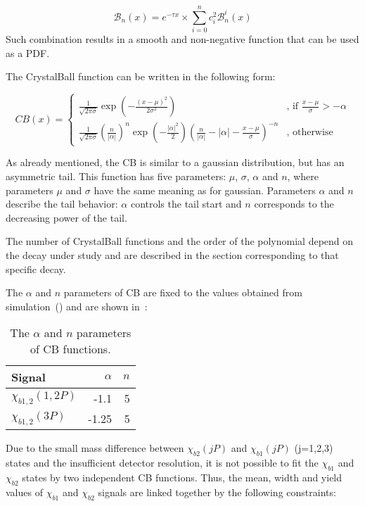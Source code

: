 \begin{equation}
\label{eq:bernstein}
{\mathscr B}_{n}(x) = e^{-\tau x} \times \sum_{i=0}^{n} c_{i}^2 {\mathscr B}_{n}^{i}(x)
\end{equation}
Such combination results in a smooth and non-negative function that can be used
as a PDF.

The CrystalBall function can be written in the following form:

\begin{equation}
CB(x) = 
\begin{cases}
\frac{1}{\sqrt{2\pi\sigma}}\exp(-\frac{{(x-\mu)}^2}{2\sigma^2}) & \text{, if $\frac{x-\mu}{\sigma} > -\alpha$} \\
\frac{1}{\sqrt{2\pi\sigma}}{(\frac{n}{|\alpha|})}^n \exp(-\frac{|\alpha|^2}{2}){(\frac{n}{|\alpha|}-|\alpha|-\frac{x-\mu}{\sigma})}^{-n} & \text{, otherwise}
\end{cases}
\label{eq:cb}
\end{equation}

As already mentioned, the CB is similar to a gaussian distribution, but has an asymmetric tail. This
function has five parameters: $\mu$, $\sigma$, $\alpha$ and $n$, where
parameters $\mu$ and $\sigma$ have the same meaning as for gaussian. Parameters
$\alpha$ and $n$ describe the tail behavior: $\alpha$ controls the tail start
and $n$ corresponds to the decreasing power of the tail. 

The number of CrystalBall functions and the order of the polynomial depend on
the decay under study and are described in the section corresponding to that
specific decay.


The $\alpha$ and $n$
parameters of CB are fixed to the values obtained from simulation~()
and are shown in~:


\begin{table}[H]
\caption{\small   The $\alpha$ and $n$ parameters of CB functions.}
\centering
\begin{tabular}{lrr}
\toprule
Signal & $\alpha$ & $n$ \\
\midrule
$\chi_{b1,2}(1,2P)$ & -1.1 & 5 \\
$\chi_{b1,2}(3P)$ & -1.25 & 5 \\
\bottomrule
\end{tabular}
\label{tab:chib:fit:tail}
\end{table}

Due to the small mass difference between $\chi_{b2}(jP)$ and $\chi_{b1}(jP)$
(j=1,2,3) states and the insufficient detector resolution, it is not possible
to fit the $\chi_{b1}$ and $\chi_{b2}$ states by two independent CB functions.
Thus, the mean, width and yield values of  $\chi_{b1}$ and $\chi_{b2}$ signals
are linked together by the following constraints:

